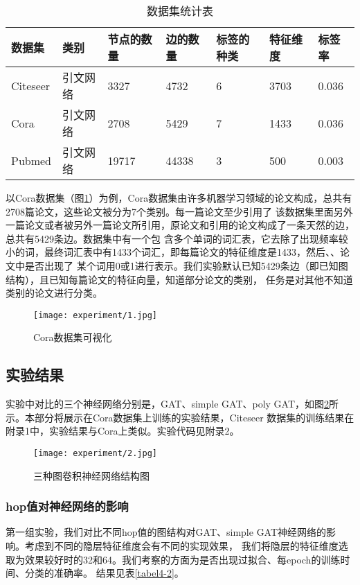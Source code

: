 \begin{table}[htbp]
    \centering
    \caption{数据集统计表}
    \label{tabel4-1}
    \begin{tabular}{lllllll}
    数据集      & 类别   & 节点的数量 & 边的数量  & 标签的种类 & 特征维度 & 标签率   \\ \hline
    Citeseer & 引文网络 & 3327  & 4732  & 6     & 3703 & 0.036 \\
    Cora     & 引文网络 & 2708  & 5429  & 7     & 1433 & 0.036 \\
    Pubmed   & 引文网络 & 19717 & 44338 & 3     & 500  & 0.003
    \end{tabular}
\end{table}

以Cora数据集（图\ref{4-1}）为例，Cora数据集由许多机器学习领域的论文构成，总共有2708篇论文，这些论文被分为7个类别。每一篇论文至少引用了
该数据集里面另外一篇论文或者被另外一篇论文所引用，原论文和引用的论文构成了一条天然的边，总共有5429条边。数据集中有一个包
含多个单词的词汇表，它去除了出现频率较小的词，最终词汇表中有1433个词汇，即每篇论文的特征维度是1433，然后、、论文中是否出现了
某个词用0或1进行表示。我们实验默认已知5429条边（即已知图结构），且已知每篇论文的特征向量，知道部分论文的类别，
任务是对其他不知道类别的论文进行分类。

\begin{figure}[htbp]
    \centering
    \texttt{[image: experiment/1.jpg]}
    \caption{\label{4-1}Cora数据集可视化}
\end{figure}

\subsection{实验结果}
实验中对比的三个神经网络分别是，GAT、simple GAT、poly GAT，如图\ref{4-2}所示。本部分将展示在Cora数据集上训练的实验结果，Citeseer
数据集的训练结果在附录1中，实验结果与Cora上类似。实验代码见附录2。
\begin{figure}[htbp]
    \centering
    \texttt{[image: experiment/2.jpg]}
    \caption{\label{4-2}三种图卷积神经网络结构图}
\end{figure}

\subsubsection{hop值对神经网络的影响}
第一组实验，我们对比不同hop值的图结构对GAT、simple GAT神经网络的影响。考虑到不同的隐层特征维度会有不同的实现效果，
我们将隐层的特征维度选取为效果较好时的32和64。我们考察的方面为是否出现过拟合、每epoch的训练时间、分类的准确率。
结果见表\ref{tabel4-2}。

